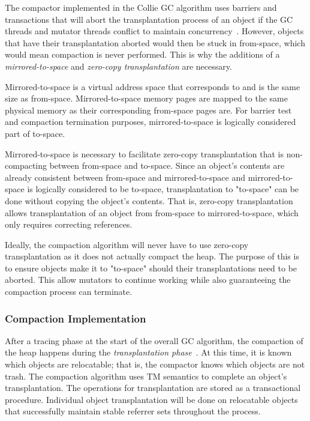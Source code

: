 \documentclass{sig-alternate}
\begin{document}
The compactor implemented in the Collie GC algorithm uses barriers 
and transactions that will abort the transplantation process of an object if the
GC threads and mutator threads conflict to maintain concurrency~\cite{Iyengar:Collie}.
However, objects that have their transplantation aborted would then be stuck
in from-space, which would mean compaction is never performed. This is why
the additions of a \emph{mirrored-to-space} and \emph{zero-copy transplantation} are necessary.

Mirrored-to-space is a virtual address space that corresponds to and is the same
size as from-space. Mirrored-to-space memory pages are mapped to the same physical
memory as their corresponding from-space pages are. For barrier test and compaction 
termination purposes, mirrored-to-space is logically considered part of to-space.

Mirrored-to-space is necessary to facilitate zero-copy transplantation that is 
non-compacting between from-space and to-space. Since an object's contents are 
already consistent between from-space and mirrored-to-space and mirrored-to-space
is logically considered to be to-space, transplantation to "to-space"
can be done without copying the object's contents. That is, zero-copy transplantation
allows transplantation of an object from from-space to mirrored-to-space, which only
requires correcting references.

Ideally, the compaction algorithm will never have to use zero-copy transplantation
as it does not actually compact the heap. The purpose of this is to ensure
objects make it to "to-space" should their transplantations need to be aborted. 
This allow mutators to continue working while also guaranteeing the compaction 
process can terminate.


\subsubsection{Compaction Implementation}
\label{sec:collieAlgorithmImplementation}

After a tracing phase at the start of the overall GC algorithm, the compaction of
the heap happens during the \emph{transplantation phase}~\cite{Iyengar:Collie}.
At this time, it is known which objects are relocatable; that is, the compactor knows which 
objects are not trash. The compaction algorithm uses TM semantics to complete an object's
transplantation. The operations for transplantation are stored as a
transactional procedure. Individual object transplantation will be done on relocatable objects 
that successfully maintain stable referrer sets throughout the process.
\end{document}

